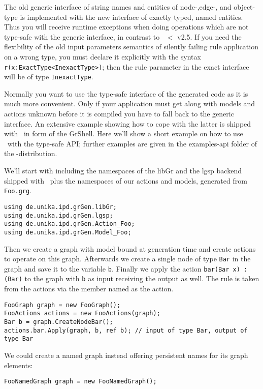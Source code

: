 \begin{note}
The old generic interface of string names and entities of node-,edge-, and object-type is implemented with the new interface of exactly typed, named entities.
Thus you will receive runtime exceptions when doing operations which are not type-safe with the generic interface, in contrast to \GrG\ $<$ v2.5.
If you need the flexibility of the old input parameters semantics of silently failing rule application on a wrong type,
you must declare it explicitly with the syntax \verb#r(x:ExactType<InexactType>)#;
then the rule parameter in the exact interface will be of type \texttt{InexactType}.
\end{note}

\begin{example}\label{ex:api1}
Normally you want to use the type-safe interface of the generated code as it is much more convenient.
Only if your application must get along with models and actions unknown before it is compiled you have to fall back to the generic interface.
An extensive example showing how to cope with the latter is shipped with \GrG\ in form of the GrShell.
Here we'll show a short example on how to use \GrG\ with the type-safe API; 
further examples are given in the examples-api folder of the \GrG-distribution.

We'll start with including the namespaces of the libGr and the lgsp backend shipped with \GrG\,
plus the namespaces of our actions and models, generated from \texttt{Foo.grg}.
\begin{verbatim}
using de.unika.ipd.grGen.libGr;
using de.unika.ipd.grGen.lgsp;
using de.unika.ipd.grGen.Action_Foo;
using de.unika.ipd.grGen.Model_Foo;
\end{verbatim}

Then we create a graph with model bound at generation time and create actions to operate on this graph.
Afterwards we create a single node of type \texttt{Bar} in the graph and save it to the variable \texttt{b}.
Finally we apply the action \texttt{bar(Bar x) : (Bar)} to the graph with \texttt{b} as input receiving the output as well.
The rule is taken from the actions via the member named as the action.
\begin{verbatim}
FooGraph graph = new FooGraph();
FooActions actions = new FooActions(graph);
Bar b = graph.CreateNodeBar();
actions.bar.Apply(graph, b, ref b); // input of type Bar, output of type Bar
\end{verbatim}

We could create a named graph instead offering persistent names for its graph elements:
\begin{verbatim}
FooNamedGraph graph = new FooNamedGraph();
\end{verbatim}
\end{example}

